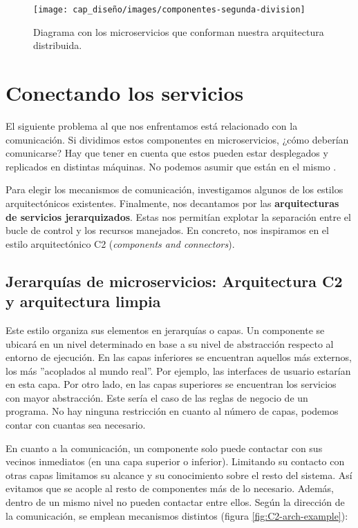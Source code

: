 \begin{figure}[htb]
  \centering
  \texttt{[image: cap\_diseño/images/componentes-segunda-division]}
  \caption{Diagrama con los microservicios que conforman nuestra arquitectura distribuida.}
  \label{fig:mape-k-microservices}
\end{figure}

\section{Conectando los servicios}

El siguiente problema al que nos enfrentamos está relacionado con la comunicación. Si dividimos estos componentes en microservicios, ¿cómo deberían comunicarse? Hay que tener en cuenta que estos pueden estar desplegados y replicados en distintas máquinas. No podemos asumir que están en el mismo .

Para elegir los mecanismos de comunicación, investigamos algunos de los estilos arquitectónicos existentes. Finalmente, nos decantamos por las \textbf{arquitecturas de servicios jerarquizados}. Estas nos permitían explotar la separación entre el bucle de control y los recursos manejados. En concreto, nos inspiramos en el estilo arquitectónico C2 (\emph {components and connectors})\cite{taylorComponentMessagebasedArchitectural1996a, UCISoftwareArchitecture}.

\subsection{Jerarquías de microservicios: Arquitectura C2 y arquitectura limpia}

Este estilo organiza sus elementos en jerarquías o capas. Un componente se ubicará en un nivel determinado en base a su nivel de abstracción respecto al entorno de ejecución. En las capas inferiores se encuentran aquellos más externos, los más ''acoplados al mundo real''. Por ejemplo, las interfaces de usuario estarían en esta capa. Por otro lado, en las capas superiores se encuentran los servicios con mayor abstracción. Este sería el caso de las reglas de negocio de un programa. No hay ninguna restricción en cuanto al número de capas, podemos contar con cuantas sea necesario.

\pagebreak

En cuanto a la comunicación, un componente solo puede contactar con sus vecinos inmediatos (en una capa superior o inferior). Limitando su contacto con otras capas limitamos su alcance y su conocimiento sobre el resto del sistema. Así evitamos que se acople al resto de componentes más de lo necesario. Además, dentro de un mismo nivel no pueden contactar entre ellos. Según la dirección de la comunicación, se emplean mecanismos distintos (figura \ref{fig:C2-arch-example}):

